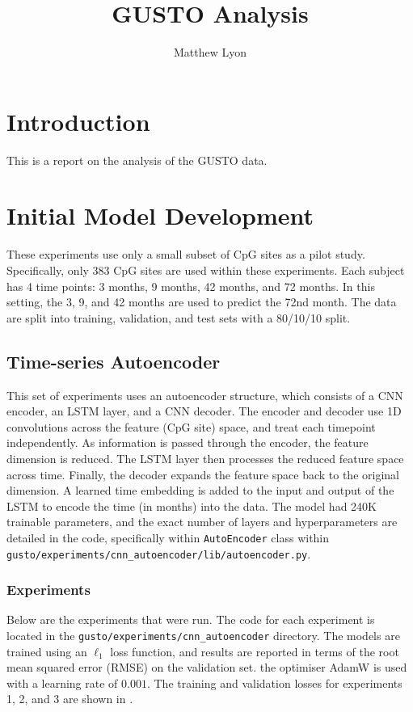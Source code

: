 \documentclass[twocolumn, 9pt]{extarticle}
\begin{document}
\title{GUSTO Analysis}

\author{Matthew Lyon}

\date{}
\maketitle

\section{Introduction}

This is a report on the analysis of the GUSTO data.

\section{Initial Model Development} \label{sec:initial_model}

These experiments use only a small subset of CpG sites as a pilot study. Specifically, only 383 CpG sites are used within these experiments. Each subject has 4 time points: 3 months, 9 months, 42 months, and 72 months. In this setting, the 3, 9, and 42 months are used to predict the 72nd month. The data are split into training, validation, and test sets with a 80/10/10 split.

\subsection{Time-series Autoencoder}

This set of experiments uses an autoencoder structure, which consists of a CNN encoder, an LSTM layer, and a CNN decoder. The encoder and decoder use 1D convolutions across the feature (CpG site) space, and treat each timepoint independently. As information is passed through the encoder, the feature dimension is reduced. The LSTM layer then processes the reduced feature space across time. Finally, the decoder expands the feature space back to the original dimension. A learned time embedding is added to the input and output of the LSTM to encode the time (in months) into the data. The model had 240K trainable parameters, and the exact number of layers and hyperparameters are detailed in the code, specifically within \texttt{AutoEncoder} class within \texttt{gusto/experiments/cnn\_autoencoder/lib/autoencoder.py}.

\subsubsection{Experiments}
Below are the experiments that were run. The code for each experiment is located in the \texttt{gusto/experiments/cnn\_autoencoder} directory. The models are trained using an $\ell_{1}$ loss function, and results are reported in terms of the root mean squared error (RMSE) on the validation set. the optimiser AdamW is used with a learning rate of $0.001$. The training and validation losses for experiments 1, 2, and 3 are shown in .
\end{document}
